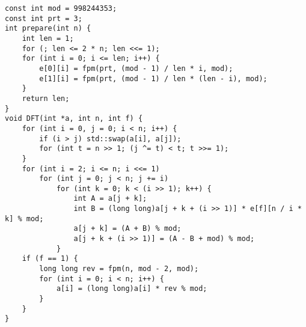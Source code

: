 \begin{lstlisting}
const int mod = 998244353;
const int prt = 3;
int prepare(int n) {
	int len = 1;
	for (; len <= 2 * n; len <<= 1);
	for (int i = 0; i <= len; i++) {
		e[0][i] = fpm(prt, (mod - 1) / len * i, mod);
		e[1][i] = fpm(prt, (mod - 1) / len * (len - i), mod);
	}
	return len;
}
void DFT(int *a, int n, int f) {
	for (int i = 0, j = 0; i < n; i++) {
		if (i > j) std::swap(a[i], a[j]);
		for (int t = n >> 1; (j ^= t) < t; t >>= 1);
	}
	for (int i = 2; i <= n; i <<= 1)
		for (int j = 0; j < n; j += i)
			for (int k = 0; k < (i >> 1); k++) {
				int A = a[j + k];
				int B = (long long)a[j + k + (i >> 1)] * e[f][n / i * k] % mod;
				a[j + k] = (A + B) % mod;
				a[j + k + (i >> 1)] = (A - B + mod) % mod;
			}
	if (f == 1) {
		long long rev = fpm(n, mod - 2, mod);
		for (int i = 0; i < n; i++) {
			a[i] = (long long)a[i] * rev % mod;
		}
	}
}
\end{lstlisting}
